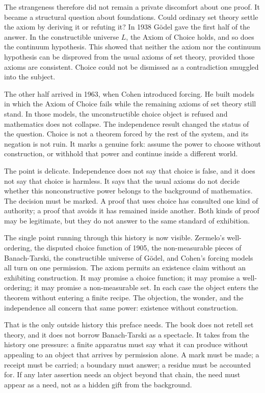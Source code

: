 The strangeness therefore did not remain a private discomfort about one proof.
It became a structural question about foundations. Could ordinary set theory
settle the axiom by deriving it or refuting it? In 1938 G\"odel gave the first
half of the answer. In the constructible universe \(L\), the Axiom of Choice
holds, and so does the continuum hypothesis. This showed that neither the
axiom nor the continuum hypothesis can be disproved from the usual axioms of
set theory, provided those axioms are consistent. Choice could not be dismissed
as a contradiction smuggled into the subject.

The other half arrived in 1963, when Cohen introduced forcing. He built models
in which the Axiom of Choice fails while the remaining axioms of set theory
still stand. In those models, the unconstructible choice object is refused and
mathematics does not collapse. The independence result changed the status of
the question. Choice is not a theorem forced by the rest of the system, and its
negation is not ruin. It marks a genuine fork: assume the power to choose
without construction, or withhold that power and continue inside a different
world.

The point is delicate. Independence does not say that choice is false, and it
does not say that choice is harmless. It says that the usual axioms do not
decide whether this nonconstructive power belongs to the background of
mathematics. The decision must be marked. A proof that uses choice has
consulted one kind of authority; a proof that avoids it has remained inside
another. Both kinds of proof may be legitimate, but they do not answer to the
same standard of exhibition.

The single point running through this history is now visible. Zermelo's
well-ordering, the disputed choice function of 1905, the non-measurable pieces
of Banach-Tarski, the constructible universe of G\"odel, and Cohen's forcing
models all turn on one permission. The axiom permits an existence claim without
an exhibiting construction. It may promise a choice function; it may promise a
well-ordering; it may promise a non-measurable set. In each case the object
enters the theorem without entering a finite recipe. The objection, the wonder,
and the independence all concern that same power: existence without
construction.

That is the only outside history this preface needs. The book does not retell
set theory, and it does not borrow Banach-Tarski as a spectacle. It takes from
the history one pressure: a finite apparatus must say what it can produce
without appealing to an object that arrives by permission alone. A mark must be
made; a receipt must be carried; a boundary must answer; a residue must be
accounted for. If any later assertion needs an object beyond that chain, the
need must appear as a need, not as a hidden gift from the background.


